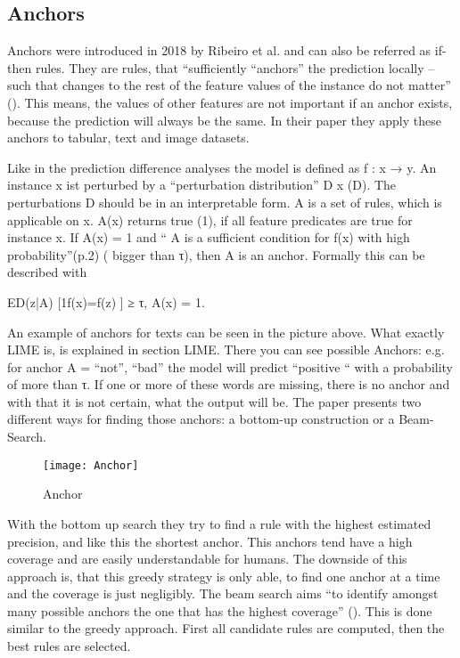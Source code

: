 \subsection{Anchors}
Anchors were introduced in 2018 by Ribeiro et al. and can also be referred as if-then rules. They are rules, that “sufficiently “anchors” the prediction locally – such that changes to the rest of the feature values of the instance do not matter” (). This means, the values of other features are not important if an anchor exists, because the prediction will always be the same. In their paper they apply these anchors to tabular, text and image datasets.
\par
Like in the prediction difference analyses the model is defined as  f : x → y. 
An instance x ist perturbed by a “perturbation distribution” D x (D). The perturbations D should be in an interpretable form. A is a set of rules, which is applicable on x. A(x) returns true (1), if all feature predicates are true for instance x.
If A(x) = 1 and “ A is a sufficient condition for f(x) with high probability”(p.2) ( bigger than τ), then A is an anchor. Formally this can be described with 
\par
 ED(z|A) [1f(x)=f(z) ] ≥ τ, A(x) = 1.
 \par
An example of anchors for texts can be seen in the picture above. What exactly LIME is, is explained in section LIME. There you can see possible Anchors: e.g. for anchor A = {“not”, “bad”} the model will predict “positive “ with a probability of more than τ. If one or more of these words are missing, there is no anchor and with that it is not certain, what the output will be.
The paper presents two different ways for finding those anchors: a bottom-up construction or a Beam-Search.
\begin{figure*}
    \center
    \texttt{[image: Anchor]}
    \caption{Anchor}
\end{figure*}
\par
With the bottom up search they try to find a rule with the highest estimated precision, and like this the shortest anchor. This anchors tend have a high coverage and are easily understandable for humans. 
The downside of this approach is, that this greedy strategy is only able, to find one anchor at a time and the coverage is just negligibly.
The beam search aims “to identify amongst many possible anchors the one that has the highest coverage” (). This is done similar to the greedy approach. First all candidate rules are computed, then the best rules are selected.

